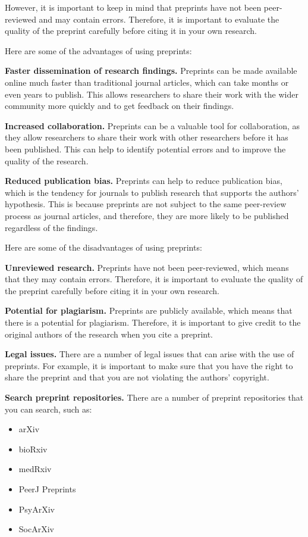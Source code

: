 \documentclass[
  b5paper]{book}
\begin{document}
However, it is important to keep in mind that preprints have not been peer-reviewed and may contain errors. Therefore, it is important to evaluate the quality of the preprint carefully before citing it in your own research.

Here are some of the advantages of using preprints:

\textbf{Faster dissemination of research findings.} Preprints can be made available online much faster than traditional journal articles, which can take months or even years to publish. This allows researchers to share their work with the wider community more quickly and to get feedback on their findings.

\textbf{Increased collaboration.} Preprints can be a valuable tool for collaboration, as they allow researchers to share their work with other researchers before it has been published. This can help to identify potential errors and to improve the quality of the research.

\textbf{Reduced publication bias.} Preprints can help to reduce publication bias, which is the tendency for journals to publish research that supports the authors' hypothesis. This is because preprints are not subject to the same peer-review process as journal articles, and therefore, they are more likely to be published regardless of the findings.

Here are some of the disadvantages of using preprints:

\textbf{Unreviewed research.} Preprints have not been peer-reviewed, which means that they may contain errors. Therefore, it is important to evaluate the quality of the preprint carefully before citing it in your own research.

\textbf{Potential for plagiarism.} Preprints are publicly available, which means that there is a potential for plagiarism. Therefore, it is important to give credit to the original authors of the research when you cite a preprint.

\textbf{Legal issues.} There are a number of legal issues that can arise with the use of preprints. For example, it is important to make sure that you have the right to share the preprint and that you are not violating the authors' copyright.

\textbf{Search preprint repositories.} There are a number of preprint repositories that you can search, such as:

\begin{itemize}
\item
  arXiv
\item
  bioRxiv
\item
  medRxiv
\item
  PeerJ Preprints
\item
  PsyArXiv
\item
  SocArXiv
\end{itemize}
\end{document}
